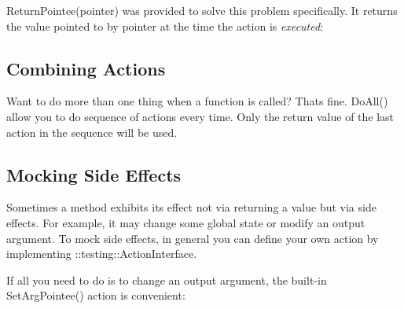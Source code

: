 {\ttfamily Return\+Pointee(pointer)} was provided to solve this problem specifically. It returns the value pointed to by {\ttfamily pointer} at the time the action is {\itshape executed}\+:


\begin{DoxyCode}{0}
\end{DoxyCode}


\subsection*{Combining Actions}

Want to do more than one thing when a function is called? That\textquotesingle{}s fine. {\ttfamily Do\+All()} allow you to do sequence of actions every time. Only the return value of the last action in the sequence will be used.


\begin{DoxyCode}{0}
\DoxyCodeLine{}
\DoxyCodeLine{\};}
\DoxyCodeLine{}
\end{DoxyCode}


\subsection*{Mocking Side Effects}

Sometimes a method exhibits its effect not via returning a value but via side effects. For example, it may change some global state or modify an output argument. To mock side effects, in general you can define your own action by implementing {\ttfamily \+::testing\+::\+Action\+Interface}.

If all you need to do is to change an output argument, the built-\/in {\ttfamily Set\+Arg\+Pointee()} action is convenient\+:


\begin{DoxyCode}{0}
\DoxyCodeLine{}
\DoxyCodeLine{\};}
\DoxyCodeLine{}
\end{DoxyCode}


